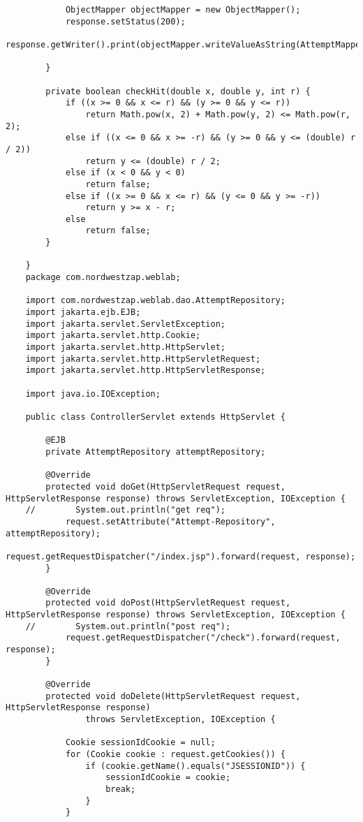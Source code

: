 \documentclass{article}
\begin{document}
\begin{verbatim}
            ObjectMapper objectMapper = new ObjectMapper();
            response.setStatus(200);
            response.getWriter().print(objectMapper.writeValueAsString(AttemptMapper.toAttemptDto(attempt)));
    
        }
    
        private boolean checkHit(double x, double y, int r) {
            if ((x >= 0 && x <= r) && (y >= 0 && y <= r))
                return Math.pow(x, 2) + Math.pow(y, 2) <= Math.pow(r, 2);
            else if ((x <= 0 && x >= -r) && (y >= 0 && y <= (double) r / 2))
                return y <= (double) r / 2;
            else if (x < 0 && y < 0)
                return false;
            else if ((x >= 0 && x <= r) && (y <= 0 && y >= -r))
                return y >= x - r;
            else
                return false;
        }
    
    }
    package com.nordwestzap.weblab;

    import com.nordwestzap.weblab.dao.AttemptRepository;
    import jakarta.ejb.EJB;
    import jakarta.servlet.ServletException;
    import jakarta.servlet.http.Cookie;
    import jakarta.servlet.http.HttpServlet;
    import jakarta.servlet.http.HttpServletRequest;
    import jakarta.servlet.http.HttpServletResponse;
    
    import java.io.IOException;
    
    public class ControllerServlet extends HttpServlet {
    
        @EJB
        private AttemptRepository attemptRepository;
    
        @Override
        protected void doGet(HttpServletRequest request, HttpServletResponse response) throws ServletException, IOException {
    //        System.out.println("get req");
            request.setAttribute("Attempt-Repository", attemptRepository);
            request.getRequestDispatcher("/index.jsp").forward(request, response);
        }
    
        @Override
        protected void doPost(HttpServletRequest request, HttpServletResponse response) throws ServletException, IOException {
    //        System.out.println("post req");
            request.getRequestDispatcher("/check").forward(request, response);
        }
    
        @Override
        protected void doDelete(HttpServletRequest request, HttpServletResponse response)
                throws ServletException, IOException {
    
            Cookie sessionIdCookie = null;
            for (Cookie cookie : request.getCookies()) {
                if (cookie.getName().equals("JSESSIONID")) {
                    sessionIdCookie = cookie;
                    break;
                }
            }
    

\end{verbatim}
\end{document}
